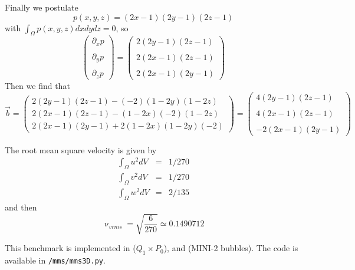 Finally we postulate 
\[
p(x,y,z) = (2x-1)(2y-1)(2z-1)
\]
with $\int_\Omega p(x,y,z) dx dy dz =0$, so
\[ 
\left(
\begin{array}{c}
\partial_x p \\ \\
\partial_y p \\ \\
\partial_z p 
\end{array}
\right) 
=
\left(
\begin{array}{c}
2(2y-1)(2z-1) \\\\
2(2x-1)(2z-1) \\\\
2(2x-1)(2y-1) 
\end{array}
\right) 
\]
Then we find that 
\[
\vec{b}
=
\left(
\begin{array}{c}
2(2y-1)(2z-1) -(-2)(1-2y)(1-2z) \\
2(2x-1)(2z-1) -(1-2x)(-2)(1-2z) \\
2(2x-1)(2y-1) +2(1-2x)(1-2y)(-2)
\end{array}
\right)
=
\left(
\begin{array}{c}
4(2y-1)(2z-1)\\ \\
4(2x-1)(2z-1) \\ \\
-2(2x-1)(2y-1) 
\end{array}
\right)
\]


The root mean square velocity is given by 
\begin{eqnarray}
\int_\Omega u^2 dV &=& 1/270 \\
\int_\Omega v^2 dV &=& 1/270 \\
\int_\Omega w^2 dV &=& 2/135
\end{eqnarray}
and then 
\[
\upnu_{vrms} =\sqrt{\frac{6}{270}} \simeq 0.1490712
\]

This benchmark is implemented in  ($Q_1\times P_0$), 
and  (MINI-2 bubbles).  
The code is available in {\tt /mms/mms3D.py}.

